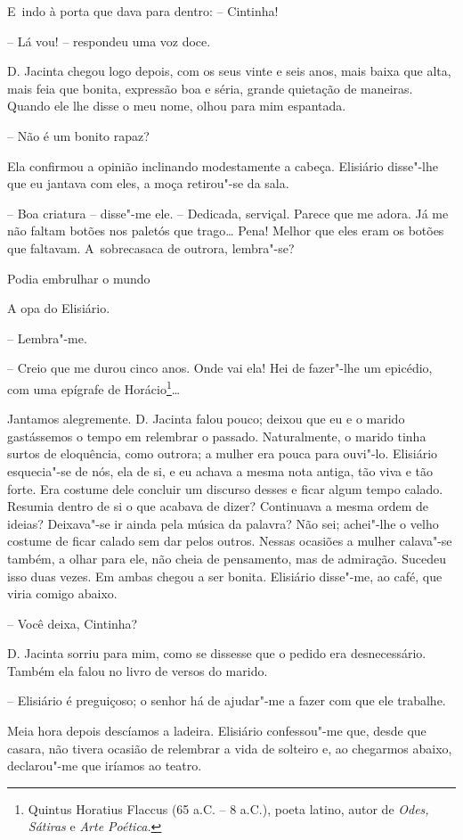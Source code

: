 E~indo à porta que dava para dentro: -- Cintinha!

-- Lá vou! -- respondeu uma voz doce.

D. Jacinta chegou logo depois, com os seus vinte e seis anos, mais baixa
que alta, mais feia que bonita, expressão boa e séria, grande quietação
de maneiras. Quando ele lhe disse o meu nome, olhou para mim espantada.

-- Não é um bonito rapaz?

Ela confirmou a opinião inclinando modestamente a cabeça. Elisiário
disse"-lhe que eu jantava com eles, a moça retirou"-se da sala.

-- Boa criatura -- disse"-me ele. -- Dedicada, serviçal. Parece que me
adora. Já me não faltam botões nos paletós que trago\ldots{} Pena! Melhor que
eles eram os botões que faltavam. A~sobrecasaca de outrora, lembra"-se?

Podia embrulhar o mundo

A opa do Elisiário.

-- Lembra"-me.

-- Creio que me durou cinco anos. Onde vai ela! Hei de fazer"-lhe um
epicédio, com uma epígrafe de Horácio\footnote{Quintus Horatius Flaccus
  (65 a.C. -- 8 a.C.), poeta latino, autor de \emph{Odes, Sátiras} e
  \emph{Arte Poética. }}\ldots{}

Jantamos alegremente. D. Jacinta falou pouco; deixou que eu e o marido
gastássemos o tempo em relembrar o passado. Naturalmente, o marido tinha
surtos de eloquência, como outrora; a mulher era pouca para ouvi"-lo.
Elisiário esquecia"-se de nós, ela de si, e eu achava a mesma nota
antiga, tão viva e tão forte. Era costume dele concluir um discurso
desses e ficar algum tempo calado. Resumia dentro de si o que acabava de
dizer? Continuava a mesma ordem de ideias? Deixava"-se ir ainda pela
música da palavra? Não sei; achei"-lhe o velho costume de ficar calado
sem dar pelos outros. Nessas ocasiões a mulher calava"-se também, a olhar
para ele, não cheia de pensamento, mas de admiração. Sucedeu isso duas
vezes. Em ambas chegou a ser bonita. Elisiário disse"-me, ao café, que
viria comigo abaixo.

-- Você deixa, Cintinha?

D. Jacinta sorriu para mim, como se dissesse que o pedido era
desnecessário. Também ela falou no livro de versos do marido.

-- Elisiário é preguiçoso; o senhor há de ajudar"-me a fazer com que ele
trabalhe.

Meia hora depois descíamos a ladeira. Elisiário confessou"-me que, desde
que casara, não tivera ocasião de relembrar a vida de solteiro e, ao
chegarmos abaixo, declarou"-me que iríamos ao teatro.

